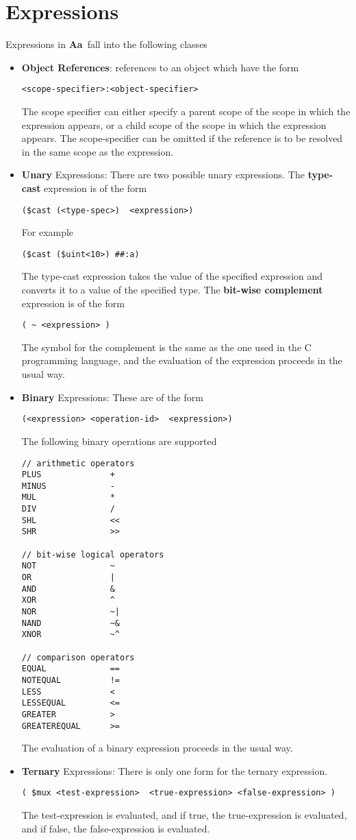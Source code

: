 \documentclass{article}
\newcommand{\Aa}{{\bf Aa}~}
\begin{document}
\section{Expressions}

Expressions in \Aa fall into the following classes
\begin{itemize}
\item {\bf Object References}: references to an object
which have the form
\begin{verbatim}
<scope-specifier>:<object-specifier>
\end{verbatim}
The scope specifier can either specify a
parent scope of the scope in which the expression appears,
or a child scope of the scope in which the 
expression appears.   The scope-specifier can be omitted
if the reference is to be resolved in the same scope
as the expression.
\item {\bf Unary} Expressions:  There are two
possible unary expressions.  The {\bf type-cast}
expression is of the form
\begin{verbatim}
($cast (<type-spec>)  <expression>)
\end{verbatim}
For example
\begin{verbatim}
($cast ($uint<10>) ##:a)
\end{verbatim}
The type-cast expression takes the value of the
specified expression and converts it to a value
of the specified type.
The {\bf bit-wise complement} expression is of the form
\begin{verbatim}
( ~ <expression> )
\end{verbatim}
The symbol for the complement is the same
as the one used in the C programming language,
and the evaluation of the expression proceeds in the
usual way.
\item {\bf Binary} Expressions: These are of the
form
\begin{verbatim}
(<expression> <operation-id>  <expression>)
\end{verbatim}
The following binary operations are supported
\begin{verbatim}
// arithmetic operators
PLUS              + 
MINUS             - 
MUL               * 
DIV               / 
SHL               <<
SHR               >> 

// bit-wise logical operators
NOT               ~     
OR                |     
AND               &    
XOR               ^   
NOR               ~|     
NAND              ~&    
XNOR              ~^   

// comparison operators
EQUAL             ==
NOTEQUAL          !=
LESS              < 
LESSEQUAL         <=
GREATER           > 
GREATEREQUAL      >=
\end{verbatim}
The evaluation of a binary expression proceeds in
the usual way.
\item {\bf Ternary} Expressions:  There is only one
form for the ternary expression.
\begin{verbatim}
( $mux <test-expression>  <true-expression> <false-expression> )
\end{verbatim}
The test-expression is evaluated, and if true, the true-expression
is evaluated, and if false, the false-expression is evaluated.
\end{itemize}
\end{document}
